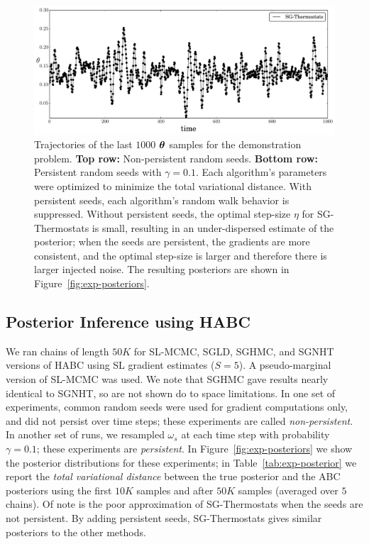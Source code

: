 \documentclass[]{article}
\begin{document}
\begin{figure}[t]
\begin{center}
\includegraphics[width=0.65\columnwidth]{./images/exponential/exp2-SG-Thermostats-theta-timeseries-omega-rate-0p1-chain3.pdf}
\vspace{-0.15in}
\caption{\small{Trajectories of the last $1000$ ${\bm \theta}$ samples for the demonstration problem.  {\bf Top row:} Non-persistent random seeds.  {\bf Bottom row:} Persistent random seeds with $\gamma = 0.1$.  Each algorithm's parameters were optimized to minimize the total variational distance.  With persistent seeds, each algorithm's random walk behavior is suppressed.  Without persistent seeds, the optimal step-size $\eta$ for SG-Thermostats is small, resulting in an under-dispersed estimate of the posterior; when the seeds are persistent, the gradients are more consistent, and the optimal step-size is larger and therefore there is larger injected noise.  The resulting posteriors are shown in Figure~\ref{fig:exp-posteriors}.
}}
\label{fig:exp-theta-traces}
\end{center}
\vspace{-0.1in}
\end{figure}

\subsection{Posterior Inference using HABC}
We ran chains of length $50K$ for SL-MCMC, SGLD, SGHMC, and SGNHT versions of HABC using SL gradient estimates ($S=5$).  A pseudo-marginal version of SL-MCMC was used.  We note that SGHMC gave results nearly identical to SGNHT, so are not shown do to space limitations.   In one set of experiments, common random seeds were used for gradient computations only, and did not persist over time steps; these experiments are called {\em non-persistent}.  In another set of runs, we resampled $\omega_s$ at each time step with probability $\gamma = 0.1$; these experiments are {\em persistent}.  In Figure~\ref{fig:exp-posteriors} we show the posterior distributions for these experiments; in Table~\ref{tab:exp-posterior} we report the {\em total variational distance} between the true posterior and the ABC posteriors using the first $10K$ samples and after $50K$ samples (averaged over $5$ chains).  Of note is the poor approximation of SG-Thermostats when the seeds are not persistent.  By adding persistent seeds, SG-Thermostats gives similar posteriors to the other methods.
\end{document}
